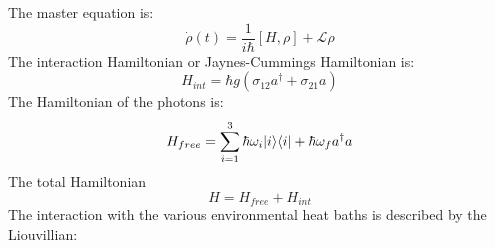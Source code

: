 \documentclass[12pt,a4paper]{article}
\DeclarePairedDelimiter\bra{\langle}{\rvert}
\DeclarePairedDelimiter\ket{\lvert}{\rangle}
\begin{document}
\tableofcontents
\newpage
The master equation is:
\begin{equation}
\dot{\rho}(t)=\frac{1}{i \hbar}[H,\rho]+ \mathcal{L}\rho
\end{equation}
The interaction Hamiltonian or Jaynes-Cummings Hamiltonian is:
\begin{equation}
H_{int}=\hbar g(\sigma_{12}a^{\dag}+\sigma_{21}a)
\end{equation}
The  Hamiltonian of the photons is:
\begin{equation}
H_{free}=\sum_{i=1}^3 \hbar \omega_i \ket{i}\bra{i}+\hbar \omega_f a^{\dag}a
\end{equation}
The total Hamiltonian
\begin{equation}
H=H_{free}+H_{int}
\end{equation}
The interaction with the various environmental heat baths is described by the Liouvillian:
\end{document}
